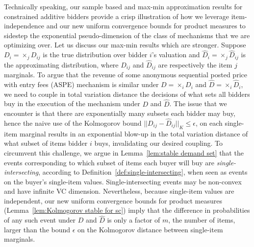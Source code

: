 Technically speaking, our sample based and max-min approximation results for constrained additive bidders provide a crisp illustration of how we leverage item-independence and our new uniform convergence bounds for product measures to sidestep the exponential pseudo-dimension of the class of mechanisms that we are optimizing over. Let us discuss our max-min results which are stronger. Suppose $D_i=\times_j D_{ij}$ is the true distribution over bidder $i$'s valuation and $\hat{D}_i=\times_j \hat{D}_{ij}$ is the approximating distribution, where $D_{ij}$ and $\hat{D}_{ij}$ are respectively the item $j$ marginals. To argue that the revenue of some anonymous sequential posted price with entry fees (ASPE) mechanism is similar under $D=\times_i D_i$ and $\hat{D}=\times_i \hat{D}_i$, we need to couple in total variation distance the decisions of what sets all bidders buy in the execution of the mechanism under $D$ and $\hat{D}$. The issue that we encounter is that there are exponentially many subsets each bidder may buy, hence the naive use of the Kolmogorov bound $||D_{ij}-\hat{D}_{ij}||_K \le \epsilon$, on each single-item marginal results in an exponential blow-up in the total variation distance of what subset of items bidder $i$ buys, invalidating our desired coupling. To circumvent this challenge, we argue in Lemma~\ref{lem:stable demand set} that the events corresponding to which subset of items each buyer will buy are {\em single-intersecting}, according to Definition~\ref{def:single-intersecting}, when seen as events on the buyer's single-item values. Single-intersecting events may be non-convex and have infinite VC dimension. Nevertheless, because single-item values are independent, our new uniform convergence bounds for product measures (Lemma~\ref{lem:Kolmogorov stable for sc}) imply that the difference in probabilities of any such event under $D$ and $\hat{D}$ is only a factor of $m$, the number of items, larger than the bound $\epsilon$ on the Kolmogorov distance between single-item marginals.


